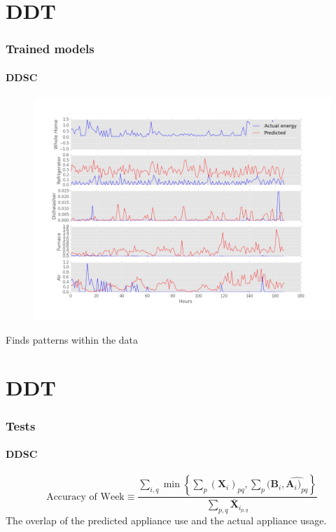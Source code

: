 \documentclass[gray]{beamer}
\begin{document}
\section{DDT}
\begin{frame}
\frametitle{Trained models}
\framesubtitle{DDSC}
\begin{figure}[H]
\centering
\includegraphics[scale=0.20]{./figures/appliances.png}
\end{figure}
\centering
Finds patterns within the data
\end{frame}
\section{DDT}
\begin{frame}
\frametitle{Tests}
\framesubtitle{DDSC}
\begin{equation*}
\text{Accuracy of Week} \equiv \frac{\sum_{i,q} \min \left\{ \sum_p ( \mathbf{X}_i)_{pq}, \sum_p ( \mathbf{B}_i,\hat{\mathbf{A}_i)_{pq}} \right\}}{\sum_{p,q} \bar{\mathbf{X}}_i_{p,q}}
\end{equation*}
\centering
The overlap of the predicted appliance use and the actual appliance usage.
\end{frame}
\end{document}
